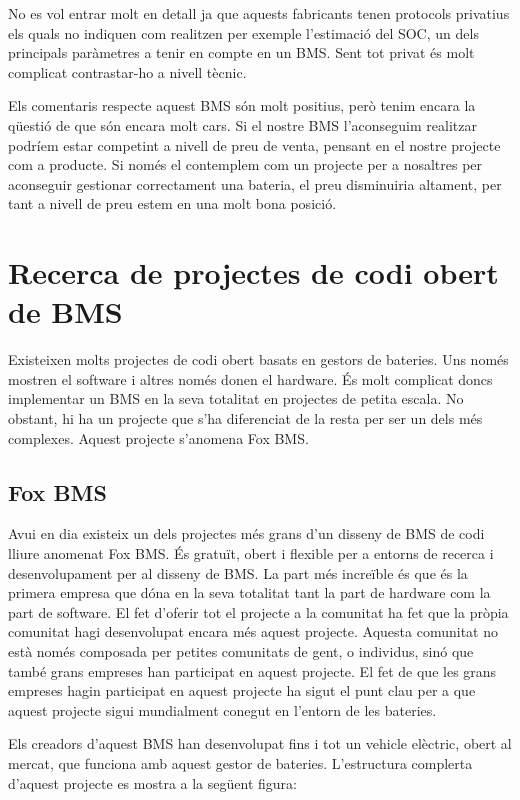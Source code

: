 No es vol entrar molt en detall ja que aquests fabricants tenen protocols privatius els quals no indiquen com realitzen per exemple l'estimació del SOC, un dels principals paràmetres a tenir en compte en un BMS. Sent tot privat és molt complicat contrastar-ho a nivell tècnic.

Els comentaris respecte aquest BMS són molt positius, però tenim encara la qüestió de que són encara molt cars. Si el nostre BMS l'aconseguim realitzar podríem estar competint a nivell de preu de venta, pensant en el nostre projecte com a producte. Si només el contemplem com un projecte per a nosaltres per aconseguir gestionar correctament una bateria, el preu disminuiria altament, per tant a nivell de preu estem en una molt bona posició.

\section{Recerca de projectes de codi obert de BMS}

Existeixen molts projectes de codi obert basats en gestors de bateries. Uns només mostren el software i altres només donen el hardware. És molt complicat doncs implementar un BMS en la seva totalitat en projectes de petita escala. No obstant, hi ha un projecte que s'ha diferenciat de la resta per ser un dels més complexes. Aquest projecte s'anomena Fox BMS.

\subsection{Fox BMS}
Avui en dia existeix un dels projectes més grans d'un disseny de BMS de codi lliure anomenat Fox BMS. És gratuït, obert i flexible per a entorns de recerca i desenvolupament per al disseny de BMS. La part més increïble és que és la primera empresa que dóna en la seva totalitat tant la part de hardware com la part de software. El fet d'oferir tot el projecte a la comunitat ha fet que la pròpia comunitat hagi desenvolupat encara més aquest projecte. Aquesta comunitat no està només composada per petites comunitats de gent, o individus, sinó que també grans empreses han participat en aquest projecte. El fet de que les grans empreses hagin participat en aquest projecte ha sigut el punt clau per a que aquest projecte sigui mundialment conegut en l'entorn de les bateries.

Els creadors d'aquest BMS han desenvolupat fins i tot un vehicle elèctric, obert al mercat, que funciona amb aquest gestor de bateries. L'estructura complerta d'aquest projecte es mostra a la següent figura:

